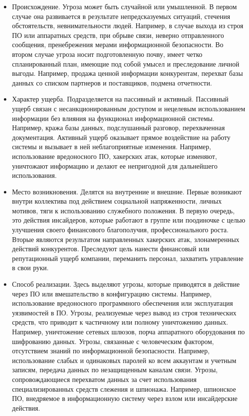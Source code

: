 \begin{itemize} 

	\item Происхождение. Угроза может быть случайной или умышленной. В первом случае она развивается в результате непредсказуемых ситуаций, стечения обстоятельств, невнимательности людей. Например, в случае выхода из строя ПО или аппаратных средств, при обрыве связи, неверно отправленного сообщения, пренебрежения мерами информационной безопасности. Во втором случае угроза носит подготовленную почву, имеет четко спланированный план, имеющие под собой умысел и преследование личной выгоды. Например, продажа ценной информации конкурентам, перехват базы данных со списком партнеров и поставщиков, подмена отчетности.

	\item Характер ущерба. Подразделяется на пассивный и активный. Пассивный ущерб связан с несанкционированным доступом и нецелевым использованием информации без влияния на функционал информационной системы. Например, кража базы данных, подслушанный разговор, перехваченная документация. Активный ущерб оказывает прямое воздействие на работу системы и вызывает в ней неблагоприятные изменения. Например, использование вредоносного ПО, хакерских атак, которые изменяют, уничтожают информацию и делают ее непригодной для дальнейшего использования.

	\item Место возникновения. Делятся на внутренние и внешние. Первые возникают внутри коллектива под действием социальной напряженности, личных мотивов, тяги к использованию служебного положения. В первую очередь, это действия инсайдеров, которые работают в группе или поодиночке с целью улучшения своего финансового благополучия, профессионального роста. Вторые являются результатом направленных хакерских атак, злонамеренных действий конкурентов. Преследуют цель нанести финансовый или репутационный ущерб компании, переманить персонал, захватить управление в свои руки.

	\item Способ реализации. Здесь выделяют угрозы, которые приводятся в действие через ПО или вмешательство в конфигурацию системы. Например, использование вредоносного программного обеспечения или эксплуатация уязвимостей в ПО. Угрозы, реализуемые через вывод из строя технических средств, что приводит к частичному или полному уничтожению данных. Например, уничтожение сетевых шлюзов, порча аппаратного оборудования по шифрованию данных. Угрозы, связанные с человеческим фактором, отсутствием знаний по информационной безопасности. Например, использование слабых и одинаковых паролей ко всем аккаунтам и учетным записям, передача данных по незащищенным каналам связи. Угрозы, сопровождающиеся перехватом данных за счет использования специализированных средств слежения и шпионажа. Например, шпионское ПО, внедряемое в информационную систему через взлом или инсайдерские действия.

\end{itemize}

